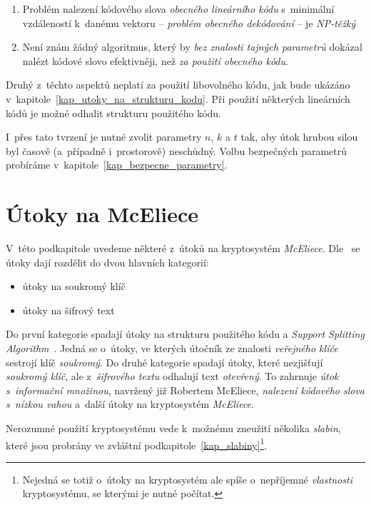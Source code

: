 \documentclass[thesis=M,czech,hidelinks]{FITthesis}[2012/06/26]
\newcommand{\0}{{\textcolor[gray]{0.75}{0}}}
\begin{document}
\begin{enumerate}
    \item Problém nalezení kódového slova \emph{obecného lineárního kódu}
        s~minimální vzdáleností k~danému vektoru -- \emph{problém obecného
        dekódování} -- je \emph{NP-těžký}~\cite{Berlekamp1}

    \item Není znám žádný algoritmus, který by \emph{bez znalosti tajných parametrů}
        dokázal nalézt kódové slovo efektivněji, než \emph{za použití obecného kódu}.
\end{enumerate}

Druhý z~těchto aspektů neplatí za použití libovolného kódu, jak bude ukázáno
v~kapitole~\ref{kap_utoky_na_strukturu_kodu}. Při použití některých lineárních
kódů je možné odhalit strukturu použitého kódu.

I~přes tato tvrzení je nutné zvolit parametry $n$, $k$ a $t$ tak, aby útok
hrubou silou byl časově (a~případně i~prostorově) neschůdný. Volbu bezpečných
parametrů probíráme v~kapitole~\ref{kap_bezpecne_parametry}.



\section{Útoky na McEliece}

V~této podkapitole uvedeme některé z~útoků na kryptosystém \emph{McEliece}.
Dle~\cite{Engelbert} se útoky dají rozdělit do dvou hlavních kategorií:

\begin{itemize}
    \item útoky na soukromý klíč
    \item útoky na šifrový text
\end{itemize}

Do první kategorie spadají útoky na strukturu použitého kódu a \emph{Support
Splitting Algorithm}~\cite{Sendrier}. Jedná se o~útoky, ve kterých útočník ze
znalosti \emph{veřejného klíče} sestrojí klíč \emph{soukromý}. Do druhé
kategorie spadají útoky, které nezjišťují \emph{soukromý klíč}, ale
z~\emph{šifrového textu} odhalují text \emph{otevřený}. To zahrnuje \emph{útok
s~informační množinou}, navržený již Robertem McEliece, \emph{nalezení kódového
slova s~nízkou vahou} a~další útoky na kryptosystém \emph{McEliece}.

Nerozumné použití kryptosystému vede k~možnému zneužití několika \emph{slabin},
které jsou probrány ve zvláštní podkapitole~\ref{kap_slabiny}\footnote{
    Nejedná se totiž o~útoky na kryptosystém ale spíše o~nepříjemné
    \emph{vlastnosti} kryptosystému, se kterými je nutné počítat.
}.
\end{document}
